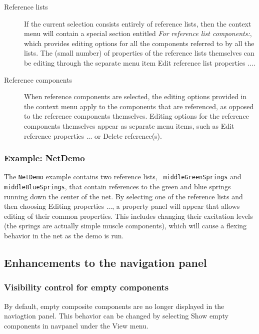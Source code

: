 \documentclass{article}
\begin{document}
\begin{description}

\item[Reference lists] If the current selection consists entirely of
reference lists, then the context menu will contain a special section
entitled {\it For reference list components:}, which provides editing
options for all the components referred to by all the lists. The
(small number) of properties of the reference lists themselves can be
editing through the separate menu item {\sf Edit reference list
properties ...}.

\item[Reference components] When reference components are selected,
the editing options provided in the context menu apply to the
components that are referenced, as opposed to the reference components
themselves. Editing options for the reference components themselves
appear as separate menu items, such as {\sf Edit reference properties
...} or {\sf Delete reference(s)}.

\end{description}

\subsubsection*{Example: NetDemo}

The {\tt NetDemo} example contains two reference lists, {\tt
middleGreenSprings} and {\tt middleBlueSprings}, that contain
references to the green and blue springs running down the center of
the net. By selecting one of the reference lists and then choosing
{\sf Editing properties ...}, a property panel will appear that allows
editing of their common properties.  This includes changing their
excitation levels (the springs are actually simple muscle components),
which will cause a flexing behavior in the net as the demo is run.

\subsection*{Enhancements to the navigation panel}

\subsubsection*{Visibility control for empty components}

By default, empty composite components are no longer displayed in the
naviagtion panel. This behavior can be changed by selecting {\sf Show
empty components in navpanel} under the {\sf View} menu.
\end{document}
